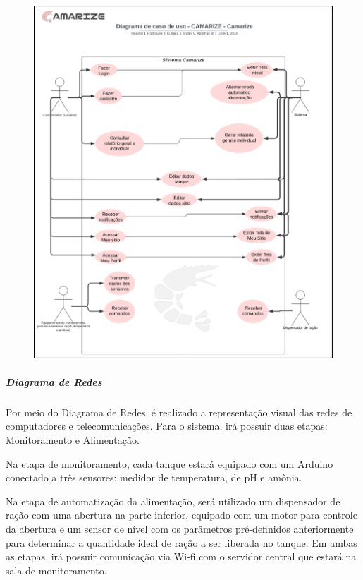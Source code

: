 \begin{figure}[!htb]
\centering
{}
%
\label{fig:caso-uso}
\includegraphics[width = 1.3\CaptionWidth]{Imagens/Caso de Uso.png}
\end{figure}

\newpage

\subparagraph*{\textbf{Diagrama de Redes}}

Por meio do Diagrama de Redes, é realizado a representação visual das redes de computadores e telecomunicações. Para o sistema, irá possuir duas etapas: Monitoramento e Alimentação. 

Na etapa de monitoramento, cada tanque estará equipado com um Arduino conectado a três sensores: medidor de temperatura, de pH e amônia. 

Na etapa de automatização da alimentação, será utilizado um dispensador de ração com uma abertura na parte inferior, equipado com um motor para controle da abertura e um sensor de nível com os parâmetros pré-definidos anteriormente para determinar a quantidade ideal de ração a ser liberada no tanque. Em ambas as etapas, irá possuir comunicação via Wi-fi com o servidor central que estará na sala de monitoramento.

